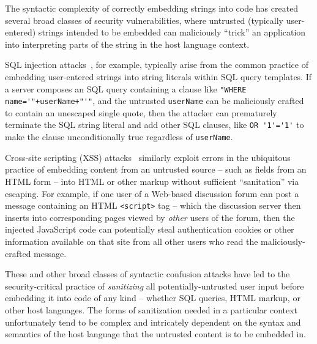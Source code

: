 The syntactic complexity of correctly embedding strings into code
has created several broad classes of security vulnerabilities,
where untrusted (typically user-entered) strings intended to be embedded
can maliciously ``trick'' an application into interpreting parts of the string
in the host language context.

SQL injection attacks~\cite{clarke12sql}, for example,
typically arise from the common practice
of embedding user-entered strings into string literals
within SQL query templates.
If a server composes an SQL query containing a clause like
\verb|"WHERE name='"+userName+"'"|, 
and the untrusted \verb|userName| can be maliciously crafted
to contain an unescaped single quote,
then the attacker can prematurely terminate the SQL string literal
and add other SQL clauses, like \verb|OR '1'='1'|
to make the clause unconditionally true regardless of \verb|userName|.

Cross-site scripting (XSS) attacks~\cite{fogie07xss}
similarly exploit errors in the ubiquitous practice
of embedding content from an untrusted source --
such as fields from an HTML form --
into HTML or other markup without sufficient ``sanitation'' via escaping.
For example, if one user of a Web-based discussion forum
can post a message containing an HTML \verb|<script>| tag --
which the discussion server then inserts into corresponding pages
viewed by \emph{other} users of the forum,
then the injected JavaScript code can potentially steal
authentication cookies or other information available on that site
from all other users who read the maliciously-crafted message.

These and other broad classes of syntactic confusion attacks
have led to the security-critical practice
of \emph{sanitizing} all potentially-untrusted user input
before embedding it into code of any kind --
whether SQL queries, HTML markup, or other host languages.
The forms of sanitization needed in a particular context
unfortunately tend to be complex and intricately dependent on
the syntax and semantics of the host language
that the untrusted content is to be embedded in.

